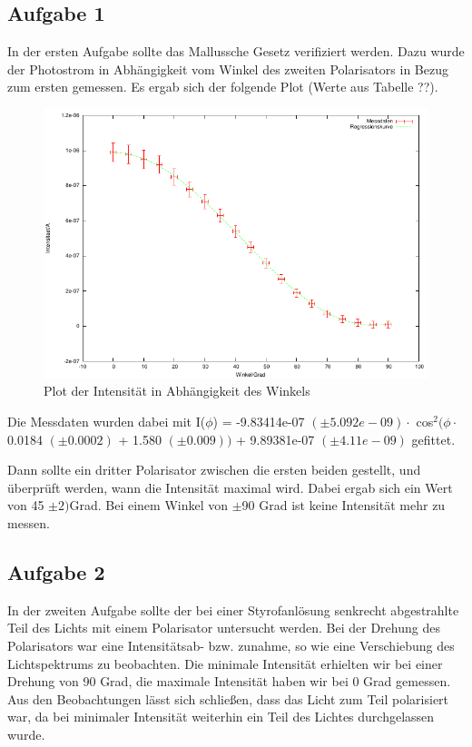 \documentclass[12pt]{scrartcl}
\begin{document}
\subsection{Aufgabe 1}
In der ersten Aufgabe sollte das Mallussche Gesetz verifiziert werden. Dazu wurde der Photostrom in Abhängigkeit vom Winkel des zweiten Polarisators in Bezug zum ersten gemessen. Es ergab sich der folgende Plot (Werte aus Tabelle ??).

\begin{figure}[H]
\centering
    \includegraphics[scale = 1]{a_1.pdf}
  	\caption[Plot der Intensität in Abhängigkeit des Winkels]{Plot der Intensität in Abhängigkeit des Winkels}
  \label{fig:a_1}
\end{figure}

Die Messdaten wurden dabei mit I($\phi$) = -9.83414e-07 $(\pm 5.092e-09) \cdot$ cos$^2(\phi \cdot$ 0.0184 $(\pm 0.0002)$ + 1.580 $(\pm 0.009) )$ + 9.89381e-07 $(\pm 4.11e-09)$ gefittet.   

Dann sollte ein dritter Polarisator zwischen die ersten beiden gestellt, und überprüft werden, wann die Intensität maximal wird. Dabei ergab sich ein Wert von 45 $\pm 2)$Grad. Bei einem Winkel von $\pm$90 Grad ist keine Intensität mehr zu messen.


\subsection{Aufgabe 2}
In der zweiten Aufgabe sollte der bei einer Styrofanlösung senkrecht abgestrahlte Teil des Lichts mit einem Polarisator untersucht werden. Bei der Drehung des Polarisators war eine Intensitätsab- bzw. zunahme, so wie eine Verschiebung des Lichtspektrums zu beobachten. Die minimale Intensität erhielten wir bei einer Drehung von 90 Grad, die maximale Intensität haben wir bei 0 Grad gemessen. Aus den Beobachtungen lässt sich schließen, dass das Licht zum Teil polarisiert war, da bei minimaler Intensität weiterhin ein Teil des Lichtes durchgelassen wurde.
\end{document}
